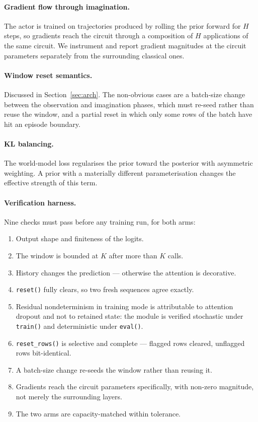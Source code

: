 \documentclass[11pt]{article}
\newif\ifdraft
\newcommand{\pend}[1]{%
  \ifdraft\textcolor{PendFG}{\textbf{[TODO:} \textit{#1}\textbf{]}}\fi}
\begin{document}
\paragraph{Gradient flow through imagination.} The actor is trained on
trajectories produced by rolling the prior forward for $H$ steps, so
gradients reach the circuit through a composition of $H$ applications of
the same circuit. We instrument and report gradient magnitudes at the
circuit parameters separately from the surrounding classical ones.

\paragraph{Window reset semantics.} Discussed in
Section~\ref{sec:arch}. The non-obvious cases are a batch-size change
between the observation and imagination phases, which must re-seed
rather than reuse the window, and a partial reset in which only some
rows of the batch have hit an episode boundary.

\paragraph{KL balancing.} The world-model loss regularises the prior
toward the posterior with asymmetric weighting. A prior with a
materially different parameterisation changes the effective strength of
this term.
\pend{report KL trajectories for both arms}

\paragraph{Verification harness.} Nine checks must pass before any
training run, for both arms:

\begin{enumerate}\itemsep1pt
\item Output shape and finiteness of the logits.
\item The window is bounded at $K$ after more than $K$ calls.
\item History changes the prediction --- otherwise the attention is
      decorative.
\item \texttt{reset()} fully clears, so two fresh sequences agree
      exactly.
\item Residual nondeterminism in training mode is attributable to
      attention dropout and not to retained state: the module is
      verified stochastic under \texttt{train()} and deterministic under
      \texttt{eval()}.
\item \texttt{reset\_rows()} is selective and complete --- flagged rows
      cleared, unflagged rows bit-identical.
\item A batch-size change re-seeds the window rather than reusing it.
\item Gradients reach the circuit parameters specifically, with non-zero
      magnitude, not merely the surrounding layers.
\item The two arms are capacity-matched within tolerance.
\end{enumerate}
\end{document}
